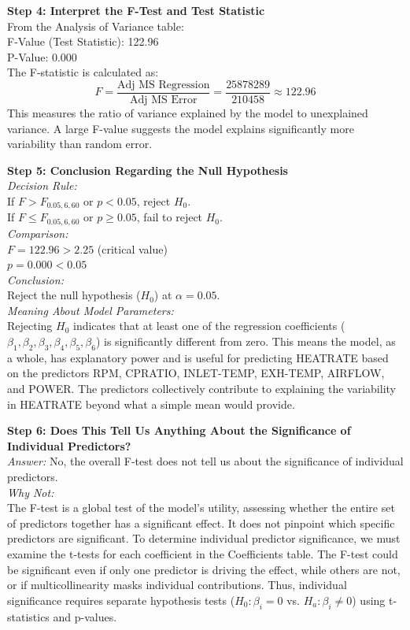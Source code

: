 \documentclass{article}
\begin{document}
\textbf{Step 4: Interpret the F-Test and Test Statistic} \\
From the Analysis of Variance table: \\
F-Value (Test Statistic): 122.96 \\
P-Value: 0.000 \\
The F-statistic is calculated as:
\[
F = \frac{\text{Adj MS Regression}}{\text{Adj MS Error}} = \frac{25878289}{210458} \approx 122.96
\]
This measures the ratio of variance explained by the model to unexplained variance. A large F-value suggests the model explains significantly more variability than random error.

\textbf{Step 5: Conclusion Regarding the Null Hypothesis} \\
\textit{Decision Rule:} \\
If \( F > F_{0.05, 6, 60} \) or \( p < 0.05 \), reject \( H_0 \). \\
If \( F \leq F_{0.05, 6, 60} \) or \( p \geq 0.05 \), fail to reject \( H_0 \). \\
\textit{Comparison:} \\
\( F = 122.96 > 2.25 \) (critical value) \\
\( p = 0.000 < 0.05 \) \\
\textit{Conclusion:} \\
Reject the null hypothesis (\( H_0 \)) at \( \alpha = 0.05 \). \\
\textit{Meaning About Model Parameters:} \\
Rejecting \( H_0 \) indicates that at least one of the regression coefficients (\( \beta_1, \beta_2, \beta_3, \beta_4, \beta_5, \beta_6 \)) is significantly different from zero. This means the model, as a whole, has explanatory power and is useful for predicting HEATRATE based on the predictors RPM, CPRATIO, INLET-TEMP, EXH-TEMP, AIRFLOW, and POWER. The predictors collectively contribute to explaining the variability in HEATRATE beyond what a simple mean would provide.

\textbf{Step 6: Does This Tell Us Anything About the Significance of Individual Predictors?} \\
\textit{Answer:} No, the overall F-test does not tell us about the significance of individual predictors. \\
\textit{Why Not:} \\
The F-test is a global test of the model’s utility, assessing whether the entire set of predictors together has a significant effect. It does not pinpoint which specific predictors  are significant. To determine individual predictor significance, we must examine the t-tests for each coefficient in the Coefficients table. The F-test could be significant even if only one predictor is driving the effect, while others are not, or if multicollinearity masks individual contributions. Thus, individual significance requires separate hypothesis tests (\( H_0: \beta_i = 0 \) vs. \( H_a: \beta_i \neq 0 \)) using t-statistics and p-values.
\end{document}
